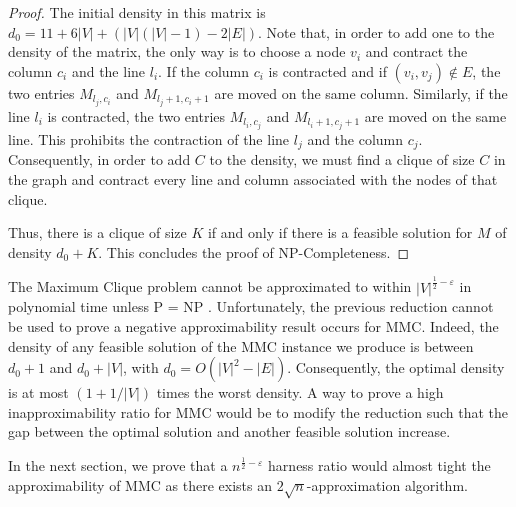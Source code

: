 \begin{proof}
%


The initial density in this matrix is $d_0 = 11 + 6|V| + (|V| (|V|-1) - 2|E|)$. Note that, in order to add one to the density of the matrix, the only way is to choose a node $v_i$ and contract the column $c_i$ and the line $l_i$. If the column $c_i$ is contracted and if $(v_i, v_j) \not \in E$, the two entries $M_{l_j,c_i}$ and $M_{l_j+1,c_i+1}$ are moved on the same column. Similarly, if the line $l_i$ is contracted, the two entries $M_{l_i,c_j}$ and $M_{l_i+1,c_j+1}$ are moved on the same line. This prohibits the contraction of the line $l_j$ and the column $c_j$. Consequently, in order to add $C$ to the density, we must find a clique of size $C$ in the graph and contract every line and column associated with the nodes of that clique.

Thus, there is a clique of size $K$ if and only if there is a feasible solution for $M$ of density $d_0 + K$. This concludes the proof of NP-Completeness.
\end{proof}
  
The Maximum Clique problem cannot be approximated to within $|V|^{\frac{1}{2} - \varepsilon}$ in polynomial time unless P = NP \cite{Hastad1999}. Unfortunately, the previous reduction cannot be used to prove a negative approximability result occurs for MMC. Indeed, the density of any feasible solution of the MMC instance we produce is between $d_0 + 1$ and $d_0 + |V|$, with $d_0 = O(|V|^2 - |E|)$. Consequently, the optimal density is at most $(1 + 1/|V|)$ times the worst density. A way to prove a high inapproximability ratio for MMC would be to modify the reduction such that the gap between the optimal solution and another feasible solution increase.

In the next section, we prove that a $n^{\frac{1}{2} - \varepsilon}$ harness ratio would almost tight the approximability of MMC as there exists an $2\sqrt{n}$-approximation algorithm.
